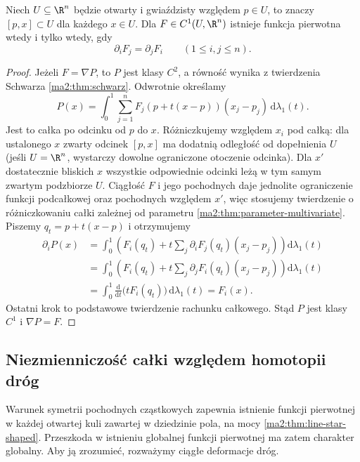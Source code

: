 \begin{twierdzenie}
\label{ma2:thm:line-star-shaped}
Niech $U\subseteq\R^n$ będzie otwarty
i gwiaździsty względem $p\in U$,
to znaczy $[p,x]\subset U$ dla każdego $x\in U$.
Dla $F\in C^1(U,\R^n)$ istnieje funkcja
pierwotna wtedy i tylko wtedy, gdy
\[
 \partial_i F_j=\partial_j F_i
 \qquad(1\le i,j\le n).
\]
\end{twierdzenie}
\begin{proof}
Jeżeli $F=\nabla P$, to $P$ jest klasy $C^2$,
a równość wynika z twierdzenia Schwarza
\ref{ma2:thm:schwarz}.
Odwrotnie określamy
\[
 P(x)=\int_0^1
 \sum_{j=1}^n F_j(p+t(x-p))(x_j-p_j)
 \,\mathrm d\lambda_1(t).
\]
Jest to całka po odcinku od $p$ do $x$.
Różniczkujemy względem $x_i$ pod całką:
dla ustalonego $x$ zwarty odcinek $[p,x]$
ma dodatnią odległość od dopełnienia $U$
(jeśli $U=\R^n$, wystarczy dowolne ograniczone
otoczenie odcinka). Dla $x'$ dostatecznie
bliskich $x$ wszystkie odpowiednie odcinki
leżą w tym samym zwartym podzbiorze $U$.
Ciągłość $F$ i jego pochodnych daje
jednolite ograniczenie funkcji podcałkowej
oraz pochodnych względem $x'$,
więc stosujemy twierdzenie o różniczkowaniu
całki zależnej od parametru
\ref{ma2:thm:parameter-multivariate}.
Piszemy $q_t=p+t(x-p)$ i otrzymujemy
\[
 \begin{aligned}
 \partial_iP(x)
 &=\int_0^1\left(F_i(q_t)+
 t\sum_j\partial_iF_j(q_t)(x_j-p_j)\right)
 \mathrm d\lambda_1(t)\\
 &=\int_0^1\left(F_i(q_t)+
 t\sum_j\partial_jF_i(q_t)(x_j-p_j)\right)
 \mathrm d\lambda_1(t)\\
 &=\int_0^1\frac{\mathrm d}{\mathrm dt}
 \bigl(tF_i(q_t)\bigr)\,\mathrm d\lambda_1(t)
 =F_i(x).
 \end{aligned}
\]
Ostatni krok to podstawowe twierdzenie
rachunku całkowego. Stąd $P$ jest klasy $C^1$
i $\nabla P=F$.
\end{proof}


\subsection{Niezmienniczość całki względem homotopii dróg}
\label{ma2:sec:line-homotopy}

Warunek symetrii pochodnych cząstkowych zapewnia
istnienie funkcji pierwotnej w każdej otwartej
kuli zawartej w dziedzinie pola, na mocy
\ref{ma2:thm:line-star-shaped}.
Przeszkoda w istnieniu globalnej funkcji
pierwotnej ma zatem charakter globalny.
Aby ją zrozumieć, rozważymy ciągłe deformacje dróg.

